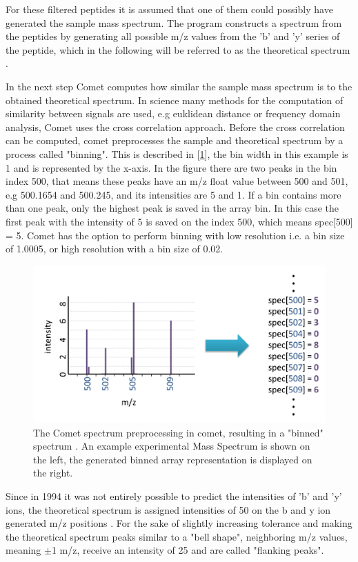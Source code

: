 \documentclass[11pt]{article}
\begin{document}
For these filtered peptides it is assumed that one of them could possibly have generated the sample mass spectrum. The program constructs a spectrum from the peptides by generating all possible m/z values from the 'b' and 'y' series of the peptide, which in the following will be referred to as the theoretical spectrum \cite{comet-first-paper}. 

In the next step Comet computes how similar the sample mass spectrum is to the obtained theoretical spectrum. In science many methods for the computation of similarity between signals are used, e.g euklidean distance or frequency domain analysis, Comet uses the cross correlation approach. Before the cross correlation can be computed, comet preprocesses the sample and theoretical spectrum by a process called "binning". This is described in [\cref{fig:binning}], the bin width in this example is 1 and is represented by the x-axis. In the figure there are two peaks in the bin index 500, that means these peaks have an m/z float value between 500 and 501, e.g 500.1654 and 500.245, and its intensities are 5 and 1. If a bin contains more than one peak, only the highest peak is saved in the array bin. In this case the first peak with the intensity of 5 is saved on the index 500, which means spec[500] = 5. Comet has the option to perform binning with low resolution i.e. a bin size of 1.0005, or high resolution with a bin size of 0.02. 
\begin{figure}[ht]
\centering
\includegraphics[width=1\textwidth]{figs/binning.png}
\caption{The Comet spectrum preprocessing in comet, resulting in a "binned" spectrum \cite{deeper-look-into-comet}. An example experimental Mass Spectrum is shown on the left, the generated binned array representation is displayed on the right.}
\label{fig:binning}
\end{figure}
Since in 1994 it was not entirely possible to predict the intensities of 'b' and 'y' ions, the theoretical spectrum is assigned intensities of 50 on the b and y ion generated m/z positions \cite{deeper-look-into-comet}. For the sake of slightly increasing tolerance and making the theoretical spectrum peaks similar to a "bell shape", neighboring m/z values, meaning $\pm$1 m/z, receive an intensity of 25 and are called "flanking peaks". 
\end{document}
